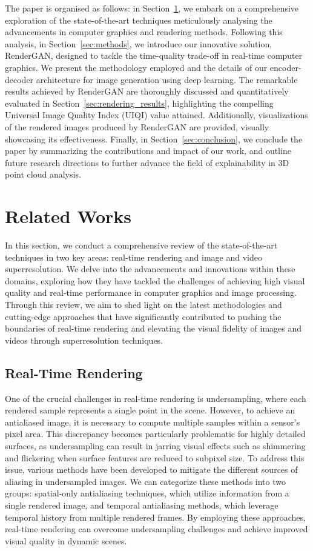 The paper is organised as follows: in Section~\ref{sec:sota}, we embark on a comprehensive exploration of the state-of-the-art techniques meticulously analysing the advancements in computer graphics and rendering methods. Following this analysis, in Section~\ref{sec:methods}, we introduce our innovative solution, RenderGAN, designed to tackle the time-quality trade-off in real-time computer graphics. We present the methodology employed and the details of our encoder-decoder architecture for image generation using deep learning. The remarkable results achieved by RenderGAN are thoroughly discussed and quantitatively evaluated in Section~\ref{sec:rendering_results}, highlighting the compelling Universal Image Quality Index (UIQI) value attained. Additionally, visualizations of the rendered images produced by RenderGAN are provided, visually showcasing its effectiveness. Finally, in Section~\ref{sec:conclusion}, we conclude the paper by summarizing the contributions and impact of our work, and outline future research directions to further advance the field of explainability in 3D point cloud analysis.


\section{Related Works}
\label{sec:sota}
In this section, we conduct a comprehensive review of the state-of-the-art techniques in two key areas: real-time rendering and image and video superresolution. We delve into the advancements and innovations within these domains, exploring how they have tackled the challenges of achieving high visual quality and real-time performance in computer graphics and image processing. Through this review, we aim to shed light on the latest methodologies and cutting-edge approaches that have significantly contributed to pushing the boundaries of real-time rendering and elevating the visual fidelity of images and videos through superresolution techniques.

\subsection{Real-Time Rendering}
One of the crucial challenges in real-time rendering is undersampling, where each rendered sample represents a single point in the scene. However, to achieve an antialiased image, it is necessary to compute multiple samples within a sensor's pixel area. This discrepancy becomes particularly problematic for highly detailed surfaces, as undersampling can result in jarring visual effects such as shimmering and flickering when surface features are reduced to subpixel size. To address this issue, various methods have been developed to mitigate the different sources of aliasing in undersampled images. We can categorize these methods into two groups: spatial-only antialiasing techniques, which utilize information from a single rendered image, and temporal antialiasing methods, which leverage temporal history from multiple rendered frames. By employing these approaches, real-time rendering can overcome undersampling challenges and achieve improved visual quality in dynamic scenes.

